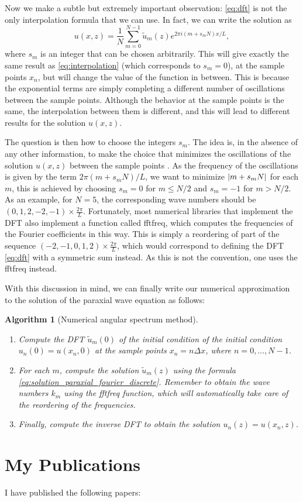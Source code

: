 \documentclass[a4paper,10pt]{report}
\newtheorem{alg}{Algorithm}
\begin{document}
Now we make a subtle but extremely important observation: \eqref{eq:dft} is not the only interpolation formula that we can use. In fact, we can write the solution as
\begin{equation}
\label{eq:interpolation2}
    u(x,z) = \frac{1}{N}\sum_{m=0}^{N-1} \tilde{u}_m(z) e^{2\pi i (m + s_m N) x/L},
\end{equation}
where $s_m$ is an integer that can be chosen arbitrarily. This will give exactly the same result as \eqref{eq:interpolation} (which corresponds to $s_m = 0$), at the sample points $x_n$, but will change the value of the function in between. This is because the exponential terms are simply completing a different number of oscillations between the sample points. Although the behavior at the sample points is the same, the interpolation between them is different, and this will lead to different results for the solution $u(x,z)$.

The question is then how to choose the integers $s_m$. The idea is, in the absence of any other information, to make the choice that minimizes the oscillations of the solution $u(x,z)$ between the sample points \cite{fftderiv}. As the frequency of the oscillations is given by the term $2\pi (m + s_m N) / L$, we want to minimize $\abs{m + s_m N}$ for each $m$, this is achieved by choosing $s_m = 0$ for $m \le N/2$ and $s_m = -1$ for $m > N/2$. As an example, for $N = 5$, the corresponding wave numbers should be $(0, 1, 2, -2, -1) \times \frac{2\pi}{L}$. Fortunately, most numerical libraries that implement the DFT also implement a function called fftfreq, which computes the frequencies of the Fourier coefficients in this way. This is simply a reordering of part of the sequence $(-2, -1, 0, 1, 2) \times \frac{2\pi}{L}$, which would correspond to defining the DFT \eqref{eq:dft} with a symmetric sum instead. As this is not the convention, one uses the fftfreq instead. 

With this discussion in mind, we can finally write our numerical approximation to the solution of the paraxial wave equation as follows:
\begin{alg}[Numerical angular spectrum method]
\leavevmode
\begin{enumerate}
    \item Compute the DFT $\tilde{u}_m(0)$ of the initial condition of the initial condition $u_n(0) = u(x_n,0)$ at the sample points $x_n = n \Delta x$, where $n = 0, \ldots, N-1$.
    \item For each $m$, compute the solution $\tilde{u}_m(z)$ using the formula \eqref{eq:solution_paraxial_fourier_discrete}. Remember to obtain the wave numbers $k_m$ using the fftfreq function, which will automatically take care of the reordering of the frequencies.
    \item Finally, compute the inverse DFT to obtain the solution $u_n(z) = u(x_n,z)$.
\end{enumerate}
\end{alg}

\chapter{My Publications}

I have published the following papers: \cite{PhysRevA.108.013503, DEOLIVEIRA2024110983, 48bj-bm8b}



\end{document}

